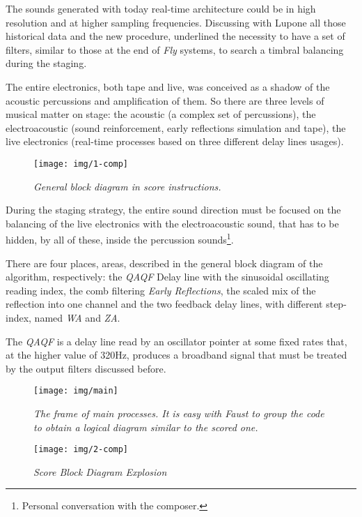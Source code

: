 \documentclass[twoside,a4paper]{article}
\begin{document}
The sounds generated with today real-time architecture could be in high resolution
and at higher sampling frequencies. Discussing with Lupone all those historical
data and the new procedure, underlined the necessity to have a set of filters,
similar to those at the end of \emph{Fly} systems, to search a timbral balancing
during the staging.

The entire electronics, both tape and live, was conceived as a shadow of the
acoustic percussions and amplification of them. So there are three levels of
musical matter on stage: the acoustic (a complex set of percussions), the
electroacoustic (sound reinforcement, early reflections simulation and tape),
the live electronics (real-time processes based on three different delay lines
usages).

\begin{figure}[ht]
\centerline{\texttt{[image: img/1-comp]}}
\caption{\label{ml-gen-dia}{\it General block diagram in score instructions.}}
\end{figure}

During the staging strategy, the entire sound direction must be focused on the
balancing of the live electronics with the electroacoustic sound, that has to be
hidden, by all of these, inside the percussion sounds\footnote{Personal
conversation with the composer.}.

There are four places, areas, described in the general block diagram of the
algorithm, respectively: the \emph{QAQF} Delay line with the sinusoidal oscillating
reading index, the comb filtering \emph{Early Reflections}, the scaled mix of
the reflection into one channel and the two feedback delay lines, with different
step-index, named \emph{WA} and \emph{ZA}.

The \emph{QAQF} is a delay line read by an oscillator pointer at some fixed rates
that, at the higher value of 320Hz, produces a broadband signal that must be
treated by the output filters discussed before.

\begin{figure}[hb]
\centerline{\texttt{[image: img/main]}}
\caption{\label{ml-main}{\it The frame of main processes. It is easy with Faust
to group the code to obtain a logical diagram similar to the scored one. }}
\end{figure}

\begin{figure}[ht]
\centerline{\texttt{[image: img/2-comp]}}
\caption{\label{ml-dia-exp}{\it Score Block Diagram Explosion}}
\end{figure}
\end{document}
